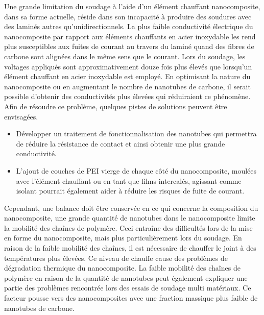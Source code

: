 Une grande limitation du soudage à l'aide d'un élément chauffant nanocomposite, dans sa forme actuelle, réside dans son incapacité à produire des soudures avec des laminés autres qu'unidirectionnels. 
La plus faible conductivité électrique du nanocomposite par rapport aux éléments chauffants en acier inoxydable les rend plus susceptibles aux fuites de courant au travers du laminé quand des fibres de carbone sont alignées dans le même sens que le courant. 
Lors du soudage, les voltages appliqués sont approximativement douze fois plus élevés que lorsqu'un élément chauffant en acier inoxydable est employé. 
En optimisant la nature du nanocomposite ou en augmentant le nombre de nanotubes de carbone, il serait possible d'obtenir des conductivités plus élevées qui réduiraient ce phénomène. 
Afin de résoudre ce problème, quelques pistes de solutions peuvent être envisagées. 

\begin{itemize}
	\item Développer un traitement de fonctionnalisation des nanotubes qui permettra de réduire la résistance de contact et ainsi obtenir une plus grande conductivité.  
	\item L'ajout de couches de PEI vierge de chaque côté du nanocomposite, moulées avec l'élément chauffant ou en tant que films intercalés, agissant comme isolant pourrait également aider à réduire les risques de fuite de courant. 
\end{itemize}

Cependant, une balance doit être conservée en ce qui concerne la composition du nanocomposite, une grande quantité de nanotubes dans le nanocomposite limite la mobilité des chaînes de polymère. 
Ceci entraîne des difficultés lors de la mise en forme du nanocomposite, mais plus particulièrement lors du soudage.
En raison de la faible mobilité des chaînes, il est nécessaire de chauffer le joint à des températures plus élevées. 
Ce niveau de chauffe cause des problèmes de dégradation thermique du nanocomposite. 
La faible mobilité des chaînes de polymère en raison de la quantité de nanotubes peut également expliquer une partie des problèmes rencontrée lors des essais de soudage multi matériaux. 
Ce facteur pousse vers des nanocomposites avec une fraction massique plus faible de nanotubes de carbone. 

